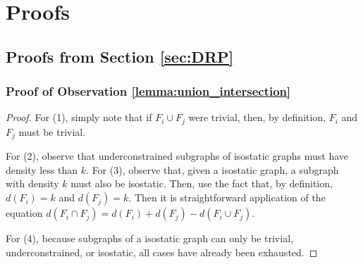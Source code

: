 \section{Proofs}
\label{sec:appendix:a}
\label{sec:appendix:proofs}

\subsection{Proofs from Section \ref{sec:DRP}}









\subsubsection{Proof of Observation \ref{lemma:union_intersection}}

\begin{proof}
For (1), simply note that if $F_i\cup F_j$ were trivial, then, by definition, $F_i$ and $F_j$ must be trivial.

For (2), observe that underconstrained subgraphs of isostatic graphs must have density less than $k$. For (3), observe that, given a isostatic graph, a subgraph with density $k$ must also be isostatic. Then, use the fact that, by definition, $d(F_i)=k$ and $d(F_j)=k$. Then it is straightforward application of the equation $d(F_i\cap F_j)=d(F_i)+d(F_j)-d(F_i\cup F_j)$.

For (4), because subgraphs of a isostatic graph can only be trivial, underconstrained, or isostatic, all cases have already been exhausted.
\end{proof}





